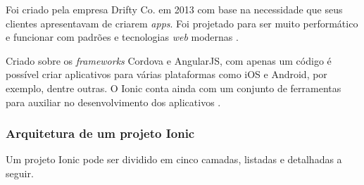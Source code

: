 Foi criado pela empresa Drifty Co. em 2013 com base na necessidade que seus clientes apresentavam de criarem \textit{apps}. 
Foi projetado para ser muito performático e funcionar com padrões e tecnologias \textit{web} modernas \cite{drifty_about_2016}.

Criado sobre os \textit{frameworks} Cordova e AngularJS, com apenas um código é possível criar aplicativos para várias 
plataformas como iOS e Android, por exemplo, dentre outras. O Ionic conta ainda com um conjunto de ferramentas para auxiliar 
no desenvolvimento dos aplicativos \cite{drifty_ionic:_2016}.

\subsubsection{Arquitetura de um projeto Ionic} \label{subsubsection:arc-ionic}

Um projeto Ionic pode ser dividido em cinco camadas, listadas e detalhadas a seguir.

